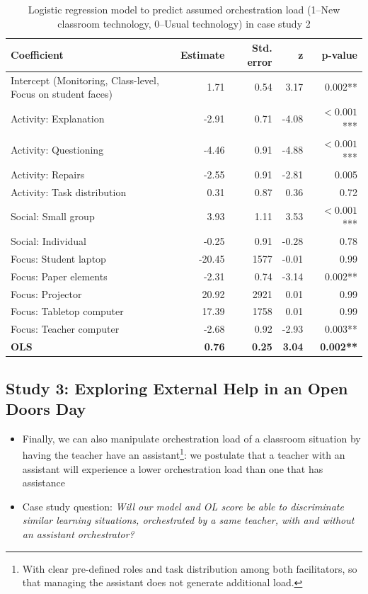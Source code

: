 \documentclass[10pt,journal,compsoc]{IEEEtran}
\begin{document}
\begin{table}[!t]
\caption{Logistic regression model to predict assumed orchestration load (1--New classroom technology, 0--Usual technology) in case study 2}
\label{tab:case2results}
\centering
\begin{tabular}{|p{2.8cm}||r|r|r|r|}
\hline
Coefficient & Estimate & Std. error & z & p-value\\
\hline
\hline
Intercept (Monitoring, Class-level, Focus on student faces) & 1.71 & 0.54 & 3.17 & 0.002** \\
Activity: Explanation & -2.91 & 0.71 & -4.08 & $<0.001$*** \\
Activity: Questioning & -4.46 & 0.91 & -4.88 & $<0.001$*** \\
Activity: Repairs & -2.55 & 0.91 & -2.81 & 0.005 \\
Activity: Task distribution & 0.31 & 0.87 & 0.36 & 0.72 \\
Social: Small group & 3.93 & 1.11 & 3.53 & $<0.001$*** \\
Social: Individual & -0.25 & 0.91 & -0.28 & 0.78 \\
Focus: Student laptop & -20.45 & 1577 & -0.01 & 0.99 \\
Focus: Paper elements & -2.31 & 0.74 & -3.14 & 0.002** \\
Focus: Projector & 20.92 & 2921 & 0.01 & 0.99 \\
Focus: Tabletop computer & 17.39 & 1758 & 0.01 & 0.99 \\
Focus: Teacher computer & -2.68 & 0.92 & -2.93 & 0.003** \\
\textbf{OLS} & \textbf{0.76} & \textbf{0.25} & \textbf{3.04} & \textbf{0.002**} \\
\hline
\end{tabular}
\end{table}


\subsection{Study 3: Exploring External Help in an Open Doors Day}
\label{sec:study3}
\begin{itemize}
\item Finally, we can also manipulate orchestration load of a classroom situation by having the teacher have an assistant\footnote{With clear pre-defined roles and task distribution among both facilitators, so that managing the assistant does not generate additional load.}: we postulate that a teacher with an assistant will experience a lower orchestration load than one that has assistance
\item Case study question: \textit{Will our model and OL score be able to discriminate similar learning situations, orchestrated by a same teacher, with and without an assistant orchestrator?}
\end{itemize}
\end{document}
